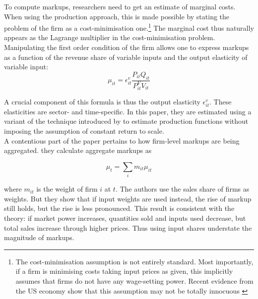 \documentclass{amsart}
\theoremstyle{definition}
\theoremstyle{remark}
\numberwithin{equation}{section}
\begin{document}
To compute markups, researchers need to get an estimate of marginal costs. When using the production approach, this is made possible by stating the problem of the firm as a cost-minimisation one.\footnote{The cost-minimisation assumption is not entirely standard. Most importantly, if a firm is minimising costs taking input prices as given, this implicitly assumes that firms do not have any wage-setting power. Recent evidence from the US economy show that this assumption may not be totally innocuous \citep{council2016labor}} The marginal cost thus naturally appears as the Lagrange multiplier in the cost-minimisation problem. Manipulating the first order condition of the firm allows one to express markups as a function of the revenue share of variable inputs and the output elasticity of variable input: $$\mu_{i t}=\epsilon_{i t}^v \frac{P_{i t} Q_{i t}}{P_{i t}^{V} V_{i t}}$$

A crucial component of this formula is thus the output elasticity $\epsilon_{i t}^v$. These elasticities are sector- and time-specific. In this paper, they are estimated using a variant of the technique introduced by \cite{olley1996dynamics} to estimate production functions without imposing the assumption of constant return to scale. \\

A contentious part of the paper pertains to how firm-level markups are being aggregated. they calculate aggregate markups as

$$ \mu_{t}=\sum_{i} m_{i t} \mu_{i t} $$ 

where $m_{it}$ is the weight of firm $i$ at $t$. The authors use the sales share of firms as weights. But they show that if input weights are used instead, the rise of markup still holds, but the rise is less pronounced. This result is consistent with the theory: if market power increases, quantities sold and inputs used decrease, but total sales increase through higher prices. Thus using input shares understate the magnitude of markups.\\


\end{document}
